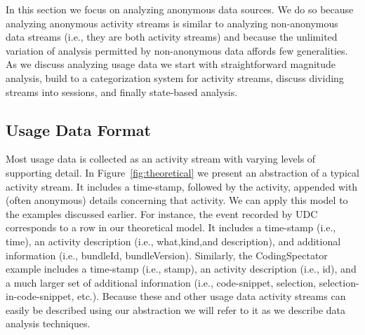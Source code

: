 In this section we focus on analyzing anonymous data sources. We do so because analyzing anonymous activity streams is similar to analyzing non-anonymous data streams (i.e., they are both activity streams) and because the unlimited variation of analysis permitted by non-anonymous data affords few generalities. As we discuss analyzing usage data we start with straightforward magnitude analysis, build to a categorization system for activity streams, discuss dividing streams into sessions, and finally state-based analysis. 

\subsection{Usage Data Format}

Most usage data is collected as an activity stream with varying levels of supporting detail. In Figure~\ref{fig:theoretical} we present an abstraction of a typical activity stream. It includes a time-stamp, followed by the activity, appended with (often anonymous) details concerning that activity. We can apply this model to the examples discussed earlier. For instance, the event recorded by UDC corresponds to a row in our theoretical model. It includes a time-stamp (i.e., time), an activity description (i.e., what,kind,and description), and additional information (i.e., bundleId, bundleVersion). Similarly, the CodingSpectator example includes a time-stamp (i.e., stamp), an activity description (i.e., id), and a much larger set of additional information (i.e., code-snippet, selection, selection-in-code-snippet, etc.). Because these and other usage data activity streams can easily be described using our abstraction we will refer to it as we describe data analysis techniques.










